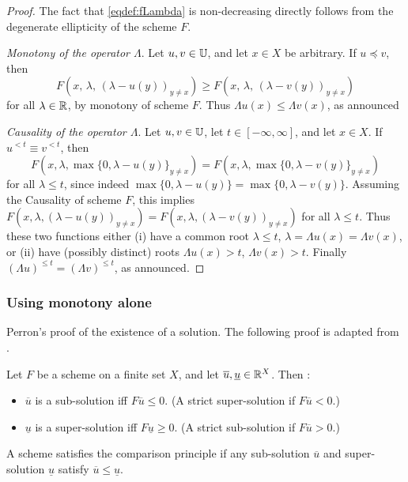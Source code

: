 \begin{proof}
	The fact that \eqref{eqdef:fLambda} is non-decreasing directly follows from the degenerate ellipticity of the scheme $F$.
	
	\emph{Monotony of the operator $\Lambda$}. Let $u,v \in \mathbb{U}$, and let $x\in X$ be arbitrary. If $u \preceq v$, then 
	\begin{equation*}
		F(x,\, \lambda,\, (\lambda-u(y))_{y \neq x}) \geq F(x,\, \lambda,\, (\lambda-v(y))_{y \neq x})
	\end{equation*}
	for all $\lambda \in \mathbb{R}$, by monotony of scheme $F$. Thus $\Lambda u(x) \leq \Lambda v(x)$, as announced

	\emph{Causality of the operator $\Lambda$}. Let $u,v \in \mathbb{U}$, let $t \in [-\infty,\infty]$, and let $x \in X$. If $u^{<t} \equiv v^{<t}$, then 
	\begin{equation*}
		F(x,\lambda, \max \{0,\lambda - u(y)\}_{y \neq x}) = F(x,\lambda, \max \{0,\lambda - v(y)\}_{y \neq x})
	\end{equation*}
	for all $\lambda \leq t$, since indeed $\max \{0,\lambda - u(y)\} = \max \{0,\lambda - v(y)\}$. Assuming the Causality of scheme $F$, this implies $F(x,\lambda, (\lambda - u(y))_{y \neq x}) = F(x,\lambda, (\lambda - v(y))_{y \neq x})$ for all $\lambda \leq t$. Thus these two functions either (i) have a common root $\lambda\leq t$, $\lambda = \Lambda u(x) = \Lambda v(x)$, or (ii) have (possibly distinct) roots $\Lambda u(x) > t$, $\Lambda v(x)>t$. Finally $(\Lambda u)^{\leq t} = (\Lambda v)^{\leq t}$, as announced.
\end{proof}



\subsubsection{Using monotony alone}

Perron's proof of the existence of a solution.
The following proof is adapted from \cite[Theorem 2.3]{mirebeau2019riemannian}.

\begin{definition}
	Let $F$ be a scheme on a finite set $X$, and let $\overline u,\underline u \in \mathbb{R}^X$. Then : 
	\begin{itemize}
		\item $\overline u$ is a sub-solution iff $F \overline u \leq 0$. 
		(A strict super-solution if $F \overline u < 0$.)
		\item $\underline u$ is a super-solution iff $F \underline u \geq 0$. 
		(A strict sub-solution if $F \overline u > 0$.)
	\end{itemize}
	
	A scheme satisfies the comparison principle if any sub-solution $\overline u$ and super-solution $\underline u$ satisfy $\overline u \leq \underline u$. 
\end{definition}

